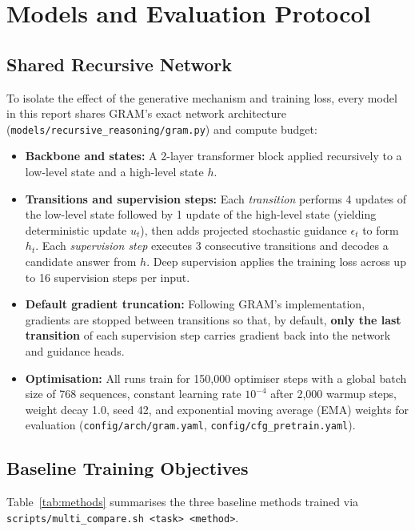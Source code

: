 \documentclass[11pt]{article}
\begin{document}
\section{Models and Evaluation Protocol}
\label{sec:models}

\subsection{Shared Recursive Network}
To isolate the effect of the generative mechanism and training loss, every model in this report shares GRAM's exact network architecture (\texttt{models/recursive\_reasoning/gram.py}) and compute budget:
\begin{itemize}
  \item \textbf{Backbone and states:} A 2-layer transformer block applied recursively to a low-level state and a high-level state $h$.
  \item \textbf{Transitions and supervision steps:} Each \emph{transition} performs 4 updates of the low-level state followed by 1 update of the high-level state (yielding deterministic update $u_t$), then adds projected stochastic guidance $\epsilon_t$ to form $h_t$. Each \emph{supervision step} executes 3 consecutive transitions and decodes a candidate answer from $h$. Deep supervision applies the training loss across up to 16 supervision steps per input.
  \item \textbf{Default gradient truncation:} Following GRAM's implementation, gradients are stopped between transitions so that, by default, \textbf{only the last transition} of each supervision step carries gradient back into the network and guidance heads.
  \item \textbf{Optimisation:} All runs train for 150,000 optimiser steps with a global batch size of 768 sequences, constant learning rate $10^{-4}$ after 2,000 warmup steps, weight decay 1.0, seed 42, and exponential moving average (EMA) weights for evaluation (\texttt{config/arch/gram.yaml}, \texttt{config/cfg\_pretrain.yaml}).
\end{itemize}

\subsection{Baseline Training Objectives}
Table~\ref{tab:methods} summarises the three baseline methods trained via \texttt{scripts/multi\_compare.sh <task> <method>}.
\end{document}
